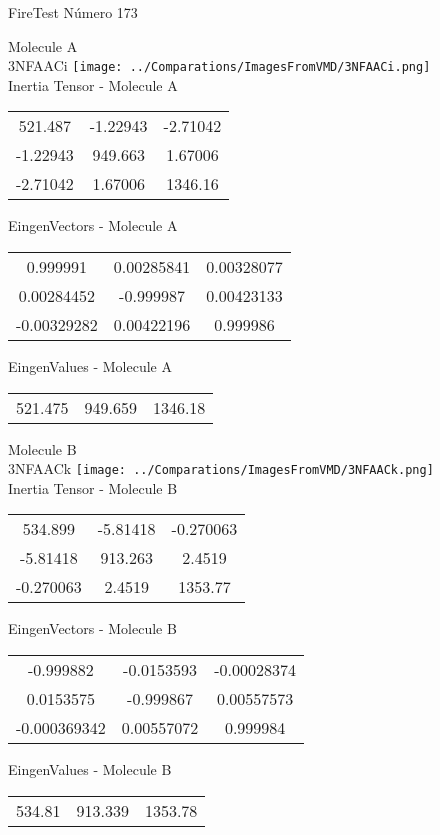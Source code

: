 \vtab[-2cm]
\begin{center}
{\large FireTest \tab Número 173}
\end{center}
\begin{multicols}{2}
\begin{center}

Molecule A \\ 
3NFAACi
\texttt{[image: ../Comparations/ImagesFromVMD/3NFAACi.png]}
\\
Inertia Tensor - Molecule A \\
\vtab

\begin{tabular}{|c c c|}
521.487	 & 	-1.22943	 & 	-2.71042	 \\
-1.22943	 & 	949.663	 & 	1.67006	 \\
-2.71042	 & 	1.67006	 & 	1346.16
\end{tabular}

\vtab
 EingenVectors - Molecule A     \\
\vtab
\begin{tabular}{|c c c|}
0.999991	 & 	0.00285841	 & 	0.00328077	 \\
0.00284452	 & 	-0.999987	 & 	0.00423133	 \\
-0.00329282	 & 	0.00422196	 & 	0.999986
\end{tabular}

\vtab
 EingenValues - Molecule A     \\
\vtab
\begin{tabular}{|c c c|}
521.475	 & 	949.659	 & 	1346.18	 \\
\end{tabular}
\columnbreak

Molecule B \\ 
3NFAACk
\texttt{[image: ../Comparations/ImagesFromVMD/3NFAACk.png]}
\\
Inertia Tensor - Molecule B \\
\vtab

\begin{tabular}{|c c c|}
534.899	 & 	-5.81418	 & 	-0.270063	 \\
-5.81418	 & 	913.263	 & 	2.4519	 \\
-0.270063	 & 	2.4519	 & 	1353.77
\end{tabular}

\vtab
 EingenVectors - Molecule B     \\
\vtab
\begin{tabular}{|c c c|}
-0.999882	 & 	-0.0153593	 & 	-0.00028374	 \\
0.0153575	 & 	-0.999867	 & 	0.00557573	 \\
-0.000369342	 & 	0.00557072	 & 	0.999984
\end{tabular}

\vtab
 EingenValues - Molecule B     \\
\vtab
\begin{tabular}{|c c c|}
534.81	 & 	913.339	 & 	1353.78	 \\
\end{tabular}

\end{center}
\end{multicols}
